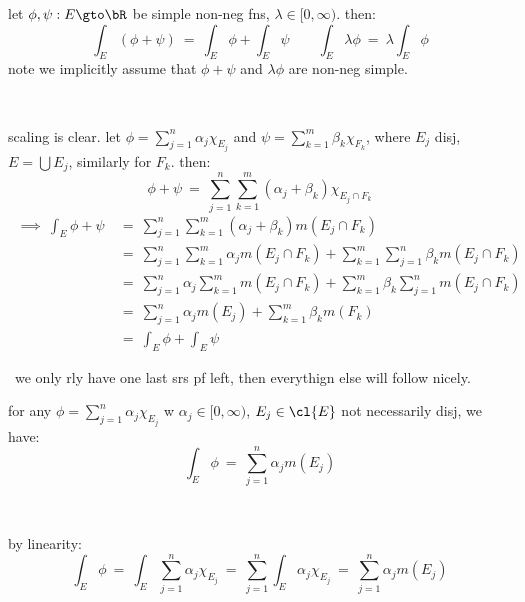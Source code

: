 \begin{prop}
	let $\phi,\psi:E\gto\bR$ be simple non-neg fns, $\lambda\in[0,\infty)$. then:
	\begin{equation*}
		\int_{E}(\phi+\psi) \ = \ \int_{E}\phi+\int_{E}\psi \qquad
		\int_{E}\lambda\phi \ = \ \lambda\int_{E}\phi
	\end{equation*}
	note we implicitly assume that $\phi+\psi$ and $\lambda\phi$ are non-neg simple.
\end{prop} \

\begin{pf}
	scaling is clear.
	let $\phi=\sum_{j=1}^{n}\alpha_{j}\chi_{E_{j}}$ and $\psi=\sum_{k=1}^{m}\beta_{k}\chi_{F_{k}}$,
	where $E_{j}$ disj, $E=\bigcup E_{j}$, similarly for $F_{k}$. then:
	\begin{equation*}
		\phi+\psi \ = \ \sum_{j=1}^{n}\sum_{k=1}^{m}(\alpha_{j}+\beta_{k})\chi_{E_{j}\cap F_{k}}
	\end{equation*} \vspace{-0.4in}
	\begin{align*}
		\ \implies \ \int_{E}\phi+\psi
		& \ = \ \sum_{j=1}^{n}\sum_{k=1}^{m}(\alpha_{j}+\beta_{k})m(E_{j}\cap F_{k}) \\
		& \ = \ \sum_{j=1}^{n}\sum_{k=1}^{m}\alpha_{j}m(E_{j}\cap F_{k})
		+ \sum_{k=1}^{m}\sum_{j=1}^{n}\beta_{k}m(E_{j}\cap F_{k}) \\
		& \ = \ \sum_{j=1}^{n}\alpha_{j}\sum_{k=1}^{m}m(E_{j}\cap F_{k})
		+ \sum_{k=1}^{m}\beta_{k}\sum_{j=1}^{n}m(E_{j}\cap F_{k}) \\
		& \ = \ \sum_{j=1}^{n}\alpha_{j}m(E_{j})+\sum_{k=1}^{m}\beta_{k}m(F_{k}) \\
		& \ = \ \int_{E}\phi+\int_{E}\psi
	\end{align*}
\end{pf} \
we only rly have one last srs pf left, then everythign else will follow nicely.

\begin{crll}
	for any $\phi=\sum_{j=1}^{n}\alpha_{j}\chi_{E_{j}}$ w $\alpha_{j}\in[0,\infty)$,
	$E_{j}\in\cl{E}$ not necessarily disj, we have:
	\begin{equation*}
		\int_{E}\phi \ = \ \sum_{j=1}^{n}\alpha_{j}m(E_{j})
	\end{equation*}
\end{crll} \

\begin{pf}
	by linearity:
	\begin{equation*}
		\int_{E}\phi \ = \ \int_{E}\sum_{j=1}^{n}\alpha_{j}\chi_{E_{j}}
		\ = \ \sum_{j=1}^{n}\int_{E}\alpha_{j}\chi_{E_{j}}
		\ = \ \sum_{j=1}^{n}\alpha_{j}m(E_{j})
	\end{equation*}
\end{pf} \

